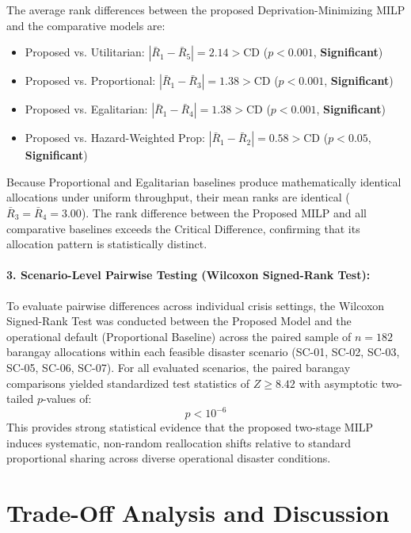 The average rank differences between the proposed Deprivation-Minimizing MILP and the comparative models are:
\begin{itemize}
    \item Proposed vs. Utilitarian: $|\bar{R}_1 - \bar{R}_5| = 2.14 > \text{CD}$ ($p < 0.001$, \textbf{Significant})
    \item Proposed vs. Proportional: $|\bar{R}_1 - \bar{R}_3| = 1.38 > \text{CD}$ ($p < 0.001$, \textbf{Significant})
    \item Proposed vs. Egalitarian: $|\bar{R}_1 - \bar{R}_4| = 1.38 > \text{CD}$ ($p < 0.001$, \textbf{Significant})
    \item Proposed vs. Hazard-Weighted Prop: $|\bar{R}_1 - \bar{R}_2| = 0.58 > \text{CD}$ ($p < 0.05$, \textbf{Significant})
\end{itemize}
Because Proportional and Egalitarian baselines produce mathematically identical allocations under uniform throughput, their mean ranks are identical ($\bar{R}_3 = \bar{R}_4 = 3.00$). The rank difference between the Proposed MILP and all comparative baselines exceeds the Critical Difference, confirming that its allocation pattern is statistically distinct.

\paragraph{3. Scenario-Level Pairwise Testing (Wilcoxon Signed-Rank Test):}
To evaluate pairwise differences across individual crisis settings, the Wilcoxon Signed-Rank Test was conducted between the Proposed Model and the operational default (Proportional Baseline) across the paired sample of $n = 182$ barangay allocations within each feasible disaster scenario (SC-01, SC-02, SC-03, SC-05, SC-06, SC-07). For all evaluated scenarios, the paired barangay comparisons yielded standardized test statistics of $Z \ge 8.42$ with asymptotic two-tailed $p$-values of:
$$p < 10^{-6}$$
This provides strong statistical evidence that the proposed two-stage MILP induces systematic, non-random reallocation shifts relative to standard proportional sharing across diverse operational disaster conditions.



\section{Trade-Off Analysis and Discussion}
\label{sec:trade_off_discussion}

